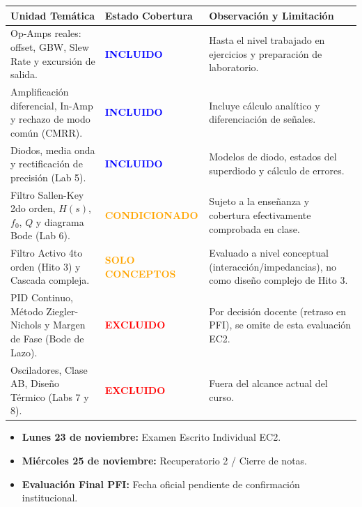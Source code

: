 \documentclass[10pt, a4paper]{article}
\begin{document}
\begin{table}[htbp]
    \centering
    \small
    \renewcommand{\arraystretch}{1.5}
    \begin{tabularx}{\textwidth}{|P{5.0cm}|P{2.8cm}|X|}
    \hline
    \textbf{Unidad Temática} & \textbf{Estado Cobertura} & \textbf{Observación y Limitación} \\ \hline
    Op-Amps reales: offset, GBW, Slew Rate y excursión de salida. & \textbf{\textcolor{blue}{INCLUIDO}} & Hasta el nivel trabajado en ejercicios y preparación de laboratorio. \\ \hline
    Amplificación diferencial, In-Amp y rechazo de modo común (CMRR). & \textbf{\textcolor{blue}{INCLUIDO}} & Incluye cálculo analítico y diferenciación de señales. \\ \hline
    Diodos, media onda y rectificación de precisión (Lab 5). & \textbf{\textcolor{blue}{INCLUIDO}} & Modelos de diodo, estados del superdiodo y cálculo de errores. \\ \hline
    Filtro Sallen-Key 2do orden, $H(s)$, $f_0$, $Q$ y diagrama Bode (Lab 6). & \textbf{\textcolor{orange}{CONDICIONADO}} & Sujeto a la enseñanza y cobertura efectivamente comprobada en clase. \\ \hline
    Filtro Activo 4to orden (Hito 3) y Cascada compleja. & \textbf{\textcolor{orange}{SOLO CONCEPTOS}} & Evaluado a nivel conceptual (interacción/impedancias), no como diseño complejo de Hito 3. \\ \hline
    PID Continuo, Método Ziegler-Nichols y Margen de Fase (Bode de Lazo). & \textbf{\textcolor{red}{EXCLUIDO}} & Por decisión docente (retraso en PFI), se omite de esta evaluación EC2. \\ \hline
    Osciladores, Clase AB, Diseño Térmico (Labs 7 y 8). & \textbf{\textcolor{red}{EXCLUIDO}} & Fuera del alcance actual del curso. \\ \hline
    \end{tabularx}
\end{table}

\begin{tcolorbox}[colback=white, colframe=black, title=\textbf{Fechas Oficiales Restantes}]
    \begin{itemize}
        \item \textbf{Lunes 23 de noviembre:} Examen Escrito Individual EC2.
        \item \textbf{Miércoles 25 de noviembre:} Recuperatorio 2 / Cierre de notas.
        \item \textbf{Evaluación Final PFI:} Fecha oficial pendiente de confirmación institucional.
    \end{itemize}
\end{tcolorbox}
\end{document}

